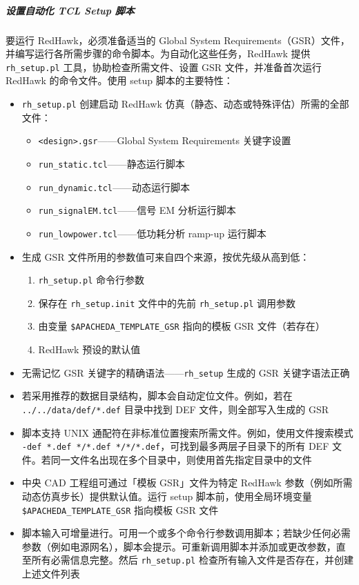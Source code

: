 \subparagraph{设置自动化 TCL Setup 脚本}
要运行 RedHawk，必须准备适当的 Global System Requirements（GSR）文件，并编写运行各所需步骤的命令脚本。为自动化这些任务，RedHawk 提供 \texttt{rh\_setup.pl} 工具，协助检查所需文件、设置 GSR 文件，并准备首次运行 RedHawk 的命令文件。使用 setup 脚本的主要特性：
\begin{itemize}
  \item \texttt{rh\_setup.pl} 创建启动 RedHawk 仿真（静态、动态或特殊评估）所需的全部文件：
  \begin{itemize}
    \item \texttt{<design>.gsr}——Global System Requirements 关键字设置
    \item \texttt{run\_static.tcl}——静态运行脚本
    \item \texttt{run\_dynamic.tcl}——动态运行脚本
    \item \texttt{run\_signalEM.tcl}——信号 EM 分析运行脚本
    \item \texttt{run\_lowpower.tcl}——低功耗分析 ramp-up 运行脚本
  \end{itemize}
  \item 生成 GSR 文件所用的参数值可来自四个来源，按优先级从高到低：
  \begin{enumerate}
    \item \texttt{rh\_setup.pl} 命令行参数
    \item 保存在 \texttt{rh\_setup.init} 文件中的先前 \texttt{rh\_setup.pl} 调用参数
    \item 由变量 \texttt{\$APACHEDA\_TEMPLATE\_GSR} 指向的模板 GSR 文件（若存在）
    \item RedHawk 预设的默认值
  \end{enumerate}
  \item 无需记忆 GSR 关键字的精确语法——\texttt{rh\_setup} 生成的 GSR 关键字语法正确
  \item 若采用推荐的数据目录结构，脚本会自动定位文件。例如，若在 \texttt{../../data/def/*.def} 目录中找到 DEF 文件，则全部写入生成的 GSR
  \item 脚本支持 UNIX 通配符在非标准位置搜索所需文件。例如，使用文件搜索模式 \texttt{-def *.def */*.def */*/*.def}，可找到最多两层子目录下的所有 DEF 文件。若同一文件名出现在多个目录中，则使用首先指定目录中的文件
  \item 中央 CAD 工程组可通过「模板 GSR」文件为特定 RedHawk 参数（例如所需动态仿真步长）提供默认值。运行 setup 脚本前，使用全局环境变量 \texttt{\$APACHEDA\_TEMPLATE\_GSR} 指向模板 GSR 文件
  \item 脚本输入可增量进行。可用一个或多个命令行参数调用脚本；若缺少任何必需参数（例如电源网名），脚本会提示。可重新调用脚本并添加或更改参数，直至所有必需信息完整。然后 \texttt{rh\_setup.pl} 检查所有输入文件是否存在，并创建上述文件列表
\end{itemize}

